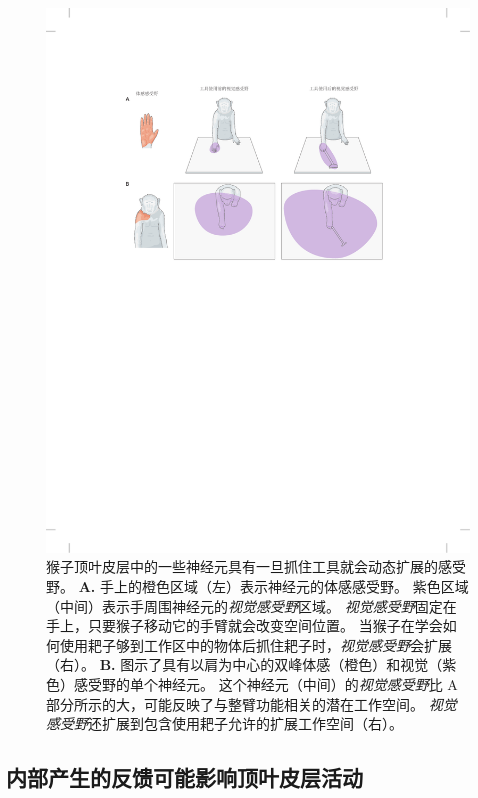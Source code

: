 \begin{figure}[htbp]
	\centering
	\includegraphics[width=1.0\linewidth]{chap34/fig_34_6}
	\caption{猴子顶叶皮层中的一些神经元具有一旦抓住工具就会动态扩展的感受野\cite{maravita2004tools}。
		\textbf{A.} 手上的橙色区域（左）表示神经元的体感感受野。
		紫色区域（中间）表示手周围神经元的\textit{视觉感受野}区域。
		\textit{视觉感受野}固定在手上，只要猴子移动它的手臂就会改变空间位置。
		当猴子在学会如何使用耙子够到工作区中的物体后抓住耙子时，\textit{视觉感受野}会扩展（右）。
		\textbf{B.} 图示了具有以肩为中心的双峰体感（橙色）和视觉（紫色）感受野的单个神经元。
		这个神经元（中间）的\textit{视觉感受野}比 A 部分所示的大，可能反映了与整臂功能相关的潜在工作空间。
		\textit{视觉感受野}还扩展到包含使用耙子允许的扩展工作空间（右）。}
	\label{fig:34_6}
\end{figure}



\subsection{内部产生的反馈可能影响顶叶皮层活动}

